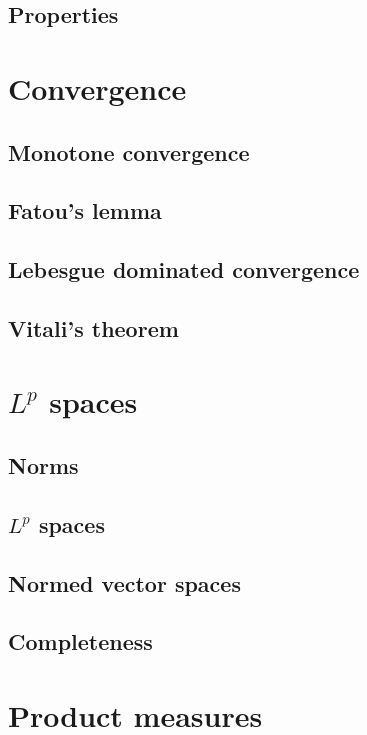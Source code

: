 \documentclass[../Year2.tex]{subfiles}
\begin{document}
\subsection{Properties}

\section{Convergence}

\subsection{Monotone convergence}

\subsection{Fatou's lemma}

\subsection{Lebesgue dominated convergence}

\subsection{Vitali's theorem}

\section{\texorpdfstring{$L^p$}{Lp} spaces}

\subsection{Norms}

\subsection{\texorpdfstring{$L^p$}{Lp} spaces}

\subsection{Normed vector spaces}

\subsection{Completeness}

\section{Product measures}
\end{document}
